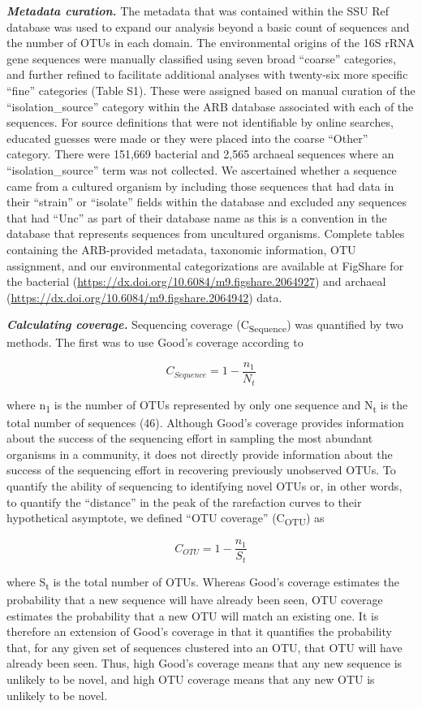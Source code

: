 \documentclass[11pt,]{article}
\begin{document}
\textbf{\emph{Metadata curation.}} The metadata that was contained
within the SSU Ref database was used to expand our analysis beyond a
basic count of sequences and the number of OTUs in each domain. The
environmental origins of the 16S rRNA gene sequences were manually
classified using seven broad ``coarse'' categories, and further refined
to facilitate additional analyses with twenty-six more specific ``fine''
categories (Table S1). These were assigned based on manual curation of
the ``isolation\_source'' category within the ARB database associated
with each of the sequences. For source definitions that were not
identifiable by online searches, educated guesses were made or they were
placed into the coarse ``Other'' category. There were 151,669 bacterial
and 2,565 archaeal sequences where an ``isolation\_source'' term was not
collected. We ascertained whether a sequence came from a cultured
organism by including those sequences that had data in their ``strain''
or ``isolate'' fields within the database and excluded any sequences
that had ``Unc'' as part of their database name as this is a convention
in the database that represents sequences from uncultured organisms.
Complete tables containing the ARB-provided metadata, taxonomic
information, OTU assignment, and our environmental categorizations are
available at FigShare for the bacterial
(\url{https://dx.doi.org/10.6084/m9.figshare.2064927}) and archaeal
(\url{https://dx.doi.org/10.6084/m9.figshare.2064942}) data.

\textbf{\emph{Calculating coverage.}} Sequencing coverage
(C\textsubscript{Sequence}) was quantified by two methods. The first was
to use Good's coverage according to

\[C_{Sequence} = 1 - \frac{n_1}{N_t}\]

where n\textsubscript{1} is the number of OTUs represented by only one
sequence and N\textsubscript{t} is the total number of sequences (46).
Although Good's coverage provides information about the success of the
sequencing effort in sampling the most abundant organisms in a
community, it does not directly provide information about the success of
the sequencing effort in recovering previously unobserved OTUs. To
quantify the ability of sequencing to identifying novel OTUs or, in
other words, to quantify the ``distance'' in the peak of the rarefaction
curves to their hypothetical asymptote, we defined ``OTU coverage''
(C\textsubscript{OTU}) as

\[C_{OTU} = 1 - \frac{n_1}{S_t}\]

where S\textsubscript{t} is the total number of OTUs. Whereas Good's
coverage estimates the probability that a new sequence will have already
been seen, OTU coverage estimates the probability that a new OTU will
match an existing one. It is therefore an extension of Good's coverage
in that it quantifies the probability that, for any given set of
sequences clustered into an OTU, that OTU will have already been seen.
Thus, high Good's coverage means that any new sequence is unlikely to be
novel, and high OTU coverage means that any new OTU is unlikely to be
novel.
\end{document}
